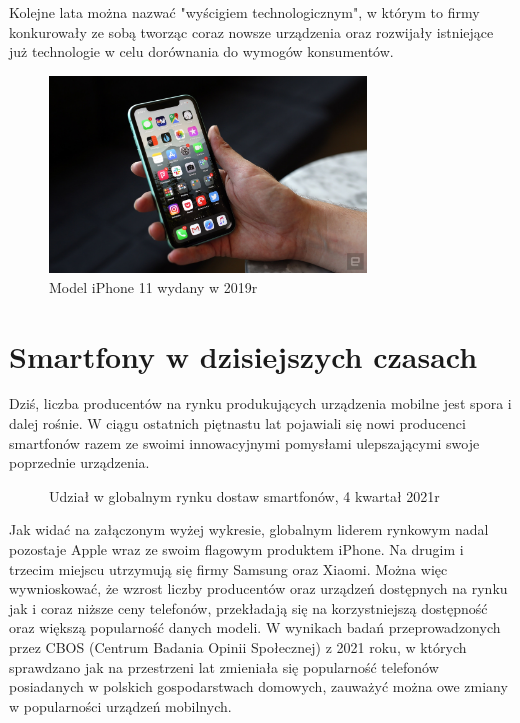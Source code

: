 \documentclass[a4paper,12pt,oneside]{book}
\begin{document}
	Kolejne lata można nazwać "wyścigiem technologicznym", w którym to firmy konkurowały ze sobą tworząc coraz nowsze urządzenia oraz rozwijały istniejące już technologie w celu dorównania do wymogów konsumentów.
	
	\begin{figure}[h]
		\centering
		\includegraphics[width=0.75\textwidth]{grafika/iphone11}
		\caption{Model iPhone 11 wydany w 2019r}
	\end{figure}
	
	\newpage
	\section{Smartfony w dzisiejszych czasach}
	Dziś, liczba producentów na rynku produkujących urządzenia mobilne jest spora i dalej rośnie. W ciągu ostatnich piętnastu lat pojawiali się nowi producenci smartfonów razem ze swoimi innowacyjnymi pomysłami ulepszającymi swoje poprzednie urządzenia. 
	
	\begin{figure}[h]
		\centering
		\caption{Udział w globalnym rynku dostaw smartfonów, 4 kwartał 2021r}
	\end{figure}
	
	Jak widać na załączonym wyżej wykresie, globalnym liderem rynkowym nadal pozostaje Apple wraz ze swoim flagowym produktem iPhone. Na drugim i trzecim miejscu utrzymują się firmy Samsung oraz Xiaomi. Można więc wywnioskować, że wzrost liczby producentów oraz urządzeń dostępnych na rynku jak i coraz niższe ceny telefonów, przekładają się na korzystniejszą dostępność oraz większą popularność danych modeli. W wynikach badań przeprowadzonych przez CBOS (Centrum Badania Opinii Społecznej) z 2021 roku, w których sprawdzano jak na przestrzeni lat zmieniała się popularność telefonów posiadanych w polskich gospodarstwach domowych, zauważyć można owe zmiany w popularności urządzeń mobilnych.
	
\end{document}
